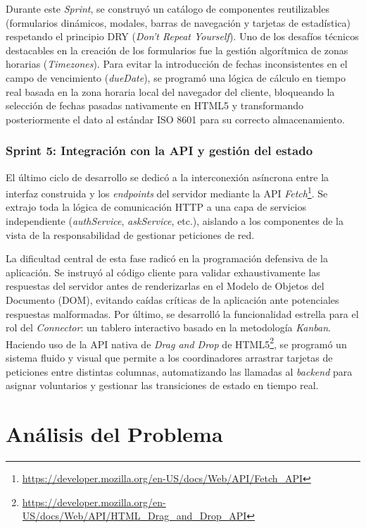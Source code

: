 \documentclass[11pt,oneside,spanish,listoffigures,listoftables]{tfgetsinf}
\begin{document}
Durante este \textit{Sprint}, se construyó un catálogo de componentes reutilizables (formularios dinámicos, modales, barras de navegación y tarjetas de estadística) respetando el principio DRY (\textit{Don't Repeat Yourself}). Uno de los desafíos técnicos destacables en la creación de los formularios fue la gestión algorítmica de zonas horarias (\textit{Timezones}). Para evitar la introducción de fechas inconsistentes en el campo de vencimiento (\textit{dueDate}), se programó una lógica de cálculo en tiempo real basada en la zona horaria local del navegador del cliente, bloqueando la selección de fechas pasadas nativamente en HTML5 y transformando posteriormente el dato al estándar ISO 8601 para su correcto almacenamiento.

\subsection{Sprint 5: Integración con la API y gestión del estado}
El último ciclo de desarrollo se dedicó a la interconexión asíncrona entre la interfaz construida y los \textit{endpoints} del servidor mediante la API \textit{Fetch}\footnote{\url{https://developer.mozilla.org/en-US/docs/Web/API/Fetch_API}}. Se extrajo toda la lógica de comunicación HTTP a una capa de servicios independiente (\textit{authService}, \textit{askService}, etc.), aislando a los componentes de la vista de la responsabilidad de gestionar peticiones de red.

La dificultad central de esta fase radicó en la programación defensiva de la aplicación. Se instruyó al código cliente para validar exhaustivamente las respuestas del servidor antes de renderizarlas en el Modelo de Objetos del Documento (DOM), evitando caídas críticas de la aplicación ante potenciales respuestas malformadas. Por último, se desarrolló la funcionalidad estrella para el rol del \textit{Connector}: un tablero interactivo basado en la metodología \textit{Kanban}. Haciendo uso de la API nativa de \textit{Drag and Drop} de HTML5\footnote{\url{https://developer.mozilla.org/en-US/docs/Web/API/HTML_Drag_and_Drop_API}}, se programó un sistema fluido y visual que permite a los coordinadores arrastrar tarjetas de peticiones entre distintas columnas, automatizando las llamadas al \textit{backend} para asignar voluntarios y gestionar las transiciones de estado en tiempo real.

\chapter{Análisis del Problema}
\end{document}
